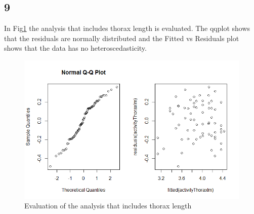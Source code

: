 \documentclass{article}
\begin{document}
    \subsection*{9}
      In Fig\ref{fig:eval} the analysis that includes thorax length is evaluated.
      The qqplot shows that the residuals are normally distributed and the Fitted vs Residuals plot shows that the data has no heteroscedasticity.
      \begin{figure}[H]
          \centering
          \includegraphics[scale=0.3]{../results/evalWithThorax.png}
          \caption{Evaluation of the analysis that includes thorax length}
          \label{fig:eval}
      \end{figure}
\end{document}
